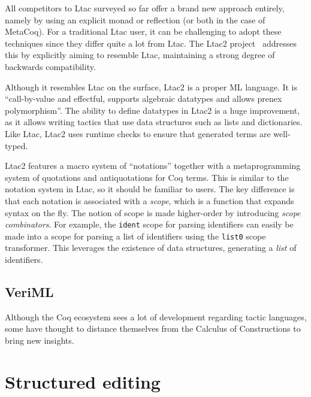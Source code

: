 All competitors to Ltac surveyed so far offer a brand new approach entirely,
namely by using an explicit monad or reflection (or both in the case of MetaCoq).
For a traditional Ltac user, it can be challenging to adopt these techniques
since they differ quite a lot from Ltac.
The Ltac2 project~\cite{ltac2} addresses this by explicitly aiming to resemble
Ltac, maintaining a strong degree of backwards compatibility.

Although it resembles Ltac on the surface, Ltac2 is a proper ML language.
It is ``call-by-value and effectful, supports algebraic datatypes and allows
prenex polymorphism''.
The ability to define datatypes in Ltac2 is a huge improvement, as it allows
writing tactics that use data structures such as lists and dictionaries.
Like Ltac, Ltac2 uses runtime checks to ensure that generated terms are
well-typed.

Ltac2 features a macro system of ``notations'' together with a metaprogramming
system of quotations and antiquotations for Coq terms.
This is similar to the notation system in Ltac, so it should be familiar to
users.
The key difference is that each notation is associated with a \emph{scope},
which is a function that expands syntax on the fly.
The notion of scope is made higher-order by introducing
\emph{scope combinators}.
For example, the \texttt{ident} scope for parsing identifiers can easily be made
into a scope for parsing a list of identifiers using the \texttt{list0} scope
transformer.
This leverages the existence of data structures, generating a \emph{list} of
identifiers.


\subsection{VeriML}

Although the Coq ecosystem sees a lot of development regarding tactic languages,
some have thought to distance themselves from the Calculus of Constructions to
bring new insights.

\section{Structured editing}
\label{sec:structured-editing}

